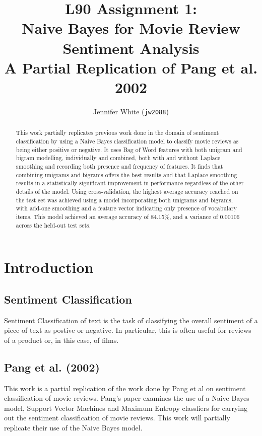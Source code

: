 \documentclass[twocolumn]{article}
\title{ L90 Assignment 1:\\
	Naive Bayes for Movie Review Sentiment Analysis \\
	\large A Partial Replication of Pang et al. 2002 }
\author{Jennifer White (\texttt{jw2088})}
\begin{document}
\maketitle
\begin{abstract}
This work partially replicates previous work done in the domain of sentiment classification by using a Naive Bayes classification model to classify movie reviews as being either positive or negative. It uses Bag of Word features with both unigram and bigram modelling, individually and combined, both with and without Laplace smoothing and recording both presence and frequency of features. It finds that combining unigrams and bigrams offers the best results and that Laplace smoothing results in a statistically significant improvement in performance regardless of the other details of the model. Using cross-validation, the highest average accuracy reached on the test set was achieved using a model incorporating both unigrams and bigrams, with add-one smoothing and a feature vector indicating only presence of vocabulary items. This model achieved an average accuracy of 84.15\%, and a variance of 0.00106 across the held-out test sets. 
\end{abstract}

\section{Introduction}

\subsection{Sentiment Classification}

Sentiment Classification of text is the task of classifying the overall sentiment of a piece of text as postive or negative. In particular, this is often useful for reviews of a product or, in this case, of films. 

\subsection{Pang et al. (2002)}

This work is a partial replication of the work done by Pang et al \cite{pang} on sentiment classification of movie reviews. Pang's paper examines the use of a Naive Bayes model, Support Vector Machines and Maximum Entropy classfiers for carrying out the sentiment classification of movie reviews. This work will partially replicate their use of the Naive Bayes model.
\end{document}
